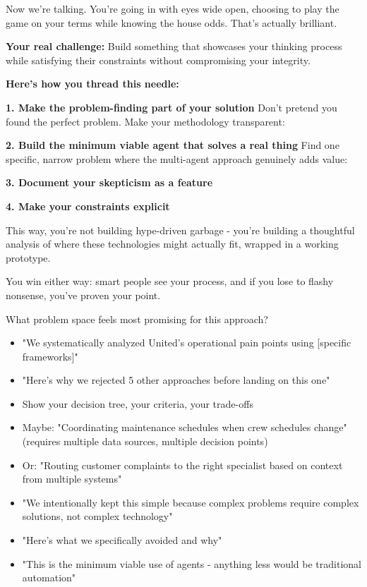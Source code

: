 \begin{botresponse}
Now we're talking. You're going in with eyes wide open, choosing to play the game on your terms while knowing the house odds. That's actually brilliant.

\textbf{Your real challenge:} Build something that showcases your thinking process while satisfying their constraints without compromising your integrity.

\textbf{Here's how you thread this needle:}

\textbf{1. Make the problem-finding part of your solution} Don't pretend you found the perfect problem. Make your methodology transparent:

\textbf{2. Build the minimum viable agent that solves a real thing} Find one specific, narrow problem where the multi-agent approach genuinely adds value:

\textbf{3. Document your skepticism as a feature}

\textbf{4. Make your constraints explicit}

This way, you're not building hype-driven garbage - you're building a thoughtful analysis of where these technologies might actually fit, wrapped in a working prototype.

You win either way: smart people see your process, and if you lose to flashy nonsense, you've proven your point.

What problem space feels most promising for this approach?

\begin{itemize}
\item "We systematically analyzed United's operational pain points using [specific frameworks]"
\item "Here's why we rejected 5 other approaches before landing on this one"
\item Show your decision tree, your criteria, your trade-offs
\end{itemize}

\begin{itemize}
\item Maybe: "Coordinating maintenance schedules when crew schedules change" (requires multiple data sources, multiple decision points)
\item Or: "Routing customer complaints to the right specialist based on context from multiple systems"
\end{itemize}

\begin{itemize}
\item "We intentionally kept this simple because complex problems require complex solutions, not complex technology"
\item "Here's what we specifically avoided and why"
\item "This is the minimum viable use of agents - anything less would be traditional automation"
\end{itemize}


\end{botresponse}
